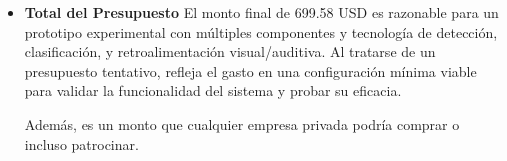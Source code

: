 \begin{itemize}
    \item \textbf{Total del Presupuesto}  
    El monto final de 699.58 USD es razonable para un prototipo experimental con múltiples componentes y tecnología de detección, clasificación, y retroalimentación visual/auditiva. Al tratarse de un presupuesto tentativo, refleja el gasto en una configuración mínima viable para validar la funcionalidad del sistema y probar su eficacia.

    Además, es un monto que cualquier empresa privada podría comprar o incluso patrocinar.
\end{itemize}
